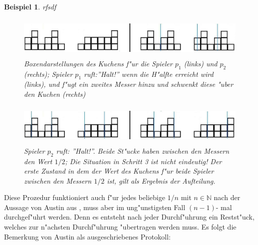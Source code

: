\documentclass[11pt, a4paper, twoside]{article}
\newcommand{\wf}{\color{white}}
\newtheorem{bsp}[satz]{Beispiel}
\numberwithin{equation}{section}
\begin{document}
\begin{bsp}\wf rfsdf
\begin{figure}[h!]
\includegraphics[height=2cm]{cc4.jpg}
\caption[Beispiel zum Austin Moving-Knife-Protokoll 1/2]{Boxendarstellungen des Kuchens f"ur die Spieler $p_1$ (links) und $p_2$ (rechts); Spieler $p_1$ ruft:''Halt!'' wenn die H"alfte erreicht wird (links), und f"ugt ein zweites Messer hinzu und schwenkt diese "uber den Kuchen (rechts)}
\end{figure}
\begin{figure}[h!]
\includegraphics[height=2cm]{cc5.jpg}
\caption[Beispiel zum Austin Moving-Knife-Protokoll 2/2]{Spieler $p_2$ ruft: ''Halt!''. Beide St"ucke haben zwischen den Messern den Wert $1/2$; Die Situation in Schritt 3 ist nicht eindeutig! Der erste Zustand in dem der Wert des Kuchens f"ur beide Spieler zwischen den Messern $1/2$ ist, gilt als Ergebnis der Aufteilung.}
\end{figure}
\end{bsp}
Diese Prozedur funktioniert auch f"ur jedes beliebige $1/n$ mit $n \in \mathbb{N}$ nach der Aussage von Austin aus \cite{20}, muss aber im ung"unstigsten Fall $(n-1)$- mal durchgef"uhrt werden. Denn es entsteht nach jeder Durchf"uhrung ein Restst"uck, welches zur n"achsten Durchf"uhrung "ubertragen werden muss. Es folgt die Bemerkung von Austin als ausgeschriebenes Protokoll:\\
\newline
\end{document}
